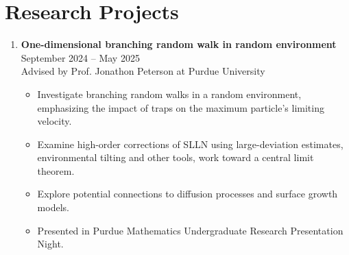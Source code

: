 \documentclass[11pt,letterpaper]{article}
\begin{document}
\section*{Research Projects}
\begin{enumerate}[leftmargin=*,label=\arabic*.]
    \item \textbf{One-dimensional branching random walk in random environment}
    \hfill September 2024 -- May 2025
    \\Advised by Prof. Jonathon Peterson at Purdue University
    \begin{itemize}
        \item Investigate branching random walks in a random environment, emphasizing the impact of traps on the maximum particle’s limiting velocity.
        \item Examine high-order corrections of SLLN using large-deviation estimates, environmental tilting and other tools, work toward a central limit theorem.
        \item Explore potential connections to diffusion processes and surface growth models.
        \item Presented in {Purdue Mathematics Undergraduate Research Presentation Night}.
    \end{itemize}
    

\end{enumerate}
\end{document}
